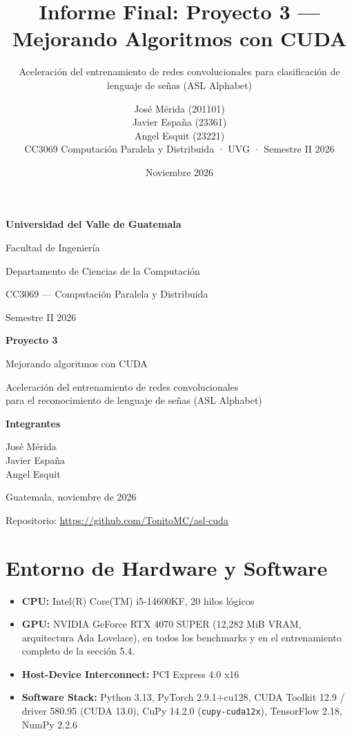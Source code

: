 \documentclass[
  11pt,
]{article}
\title{Informe Final: Proyecto 3 --- Mejorando Algoritmos
con CUDA}
\subtitle{Aceleración del entrenamiento de redes
convolucionales para clasificación de lenguaje de señas (ASL
Alphabet)}
\author{José Mérida (201101)\\ Javier España (23361)\\ Angel Esquit (23221)\\[4mm]
CC3069 Computación Paralela y Distribuida · UVG · Semestre II 2026}
\date{Noviembre 2026}
\providecommand{\tightlist}{%
  \setlength{\itemsep}{0pt}\setlength{\parskip}{0pt}}
\begin{document}
\begin{titlepage}
\centering
\vspace*{1cm}
{\Large\bfseries Universidad del Valle de Guatemala\par}
\vspace{2mm}
{\large Facultad de Ingeniería\par}
{\large Departamento de Ciencias de la Computación\par}
\vspace{8mm}
{\large CC3069 --- Computación Paralela y Distribuida\par}
{\large Semestre II 2026\par}
\vfill
{\huge\bfseries Proyecto 3\par}
\vspace{4mm}
{\LARGE Mejorando algoritmos con CUDA\par}
\vspace{8mm}
{\large Aceleración del entrenamiento de redes convolucionales\\
para el reconocimiento de lenguaje de señas (ASL Alphabet)\par}
\vfill
{\large\bfseries Integrantes\par}
\vspace{3mm}
{\large
José Mérida \\[1mm]
Javier España \\[1mm]
Angel Esquit \par}
\vspace{2cm}
{\large Guatemala, noviembre de 2026\par}
\vspace{6mm}
{\large Repositorio: \href{https://github.com/TonitoMC/asl-cuda}{https://github.com/TonitoMC/asl-cuda}\par}
\end{titlepage}
\setcounter{page}{2}
\clearpage
\tableofcontents
\clearpage

\clearpage
\section*{Entorno de Hardware y Software}

\begin{itemize}
\tightlist
\item
  \textbf{CPU:} Intel(R) Core(TM) i5-14600KF, 20 hilos
  lógicos
\item
  \textbf{GPU:} NVIDIA GeForce RTX 4070 SUPER (12,282 MiB
  VRAM, arquitectura Ada Lovelace), en todos los benchmarks
  y en el entrenamiento completo de la sección 5.4.
\item
  \textbf{Host-Device Interconnect:} PCI Express 4.0 x16
\item
  \textbf{Software Stack:} Python 3.13, PyTorch 2.9.1+cu128,
  CUDA Toolkit 12.9 / driver 580.95 (CUDA 13.0), CuPy 14.2.0
  (\texttt{cupy-cuda12x}), TensorFlow 2.18, NumPy 2.2.6
\end{itemize}
\end{document}
